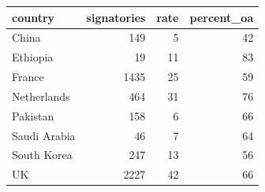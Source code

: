 \begin{table}[ht]
\centering
\begin{tabular}{lrrr}
 country & signatories & rate & percent\_oa \\ 
  \hline
China & 149 & 5 & 42 \\ 
  Ethiopia & 19 & 11 & 83 \\ 
  France & 1435 & 25 & 59 \\ 
  Netherlands & 464 & 31 & 76 \\ 
  Pakistan & 158 & 6 & 66 \\ 
  Saudi Arabia & 46 & 7 & 64 \\ 
  South Korea & 247 & 13 & 56 \\ 
  UK & 2227 & 42 & 66 \\ 
  \end{tabular}
\end{table}
